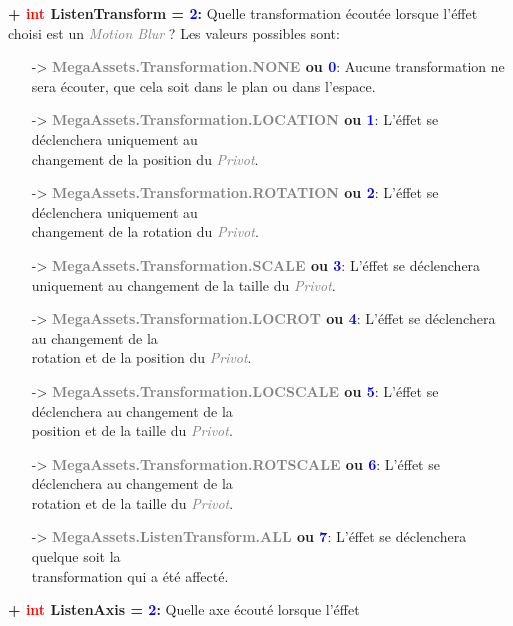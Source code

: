 \documentclass[a4paper, 11pt]{article}
\begin{document}
	\textbf{+ \textcolor{red}{int} ListenTransform = \textcolor{blue}{2}:} Quelle transformation écoutée 
	lorsque l'éffet choisi est un \textit{\textcolor{gray}{Motion Blur}} ? Les valeurs possibles sont:
	\begin{itemize}
		\item [-> \textbf{\textcolor{gray}{MegaAssets.Transformation.NONE} ou \textcolor{blue}{0}}:] Aucune 
		transformation ne sera écouter, que cela soit dans le plan ou dans l'espace.
		\item [-> \textbf{\textcolor{gray}{MegaAssets.Transformation.LOCATION} ou \textcolor{blue}{1}}:] 
		L'éffet se déclenchera uniquement au \\changement de la position du \textit{\textcolor{gray}
		{Privot}}.
		\item [-> \textbf{\textcolor{gray}{MegaAssets.Transformation.ROTATION} ou \textcolor{blue}{2}}:] 
		L'éffet se déclenchera uniquement au \\changement de la rotation du \textit{\textcolor{gray}
		{Privot}}.
		\newpage \item [-> \textbf{\textcolor{gray}{MegaAssets.Transformation.SCALE} ou \textcolor{blue}
		{3}}:] L'éffet se déclenchera uniquement au changement de la taille du \textit{\textcolor{gray}
		{Privot}}.
		\item [-> \textbf{\textcolor{gray}{MegaAssets.Transformation.LOCROT} ou \textcolor{blue}{4}}:] 
		L'éffet se déclenchera au changement de la \\rotation et de la position du \textit{\textcolor{gray}
		{Privot}}.
		\item [-> \textbf{\textcolor{gray}{MegaAssets.Transformation.LOCSCALE} ou \textcolor{blue}{5}}:] 
		L'éffet se déclenchera au changement de la \\position et de la taille du \textit{\textcolor{gray}
		{Privot}}.
		\item [-> \textbf{\textcolor{gray}{MegaAssets.Transformation.ROTSCALE} ou \textcolor{blue}{6}}:] 
		L'éffet se déclenchera au changement de la \\rotation et de la taille du \textit{\textcolor{gray}
		{Privot}}.
		\item [-> \textbf{\textcolor{gray}{MegaAssets.ListenTransform.ALL} ou \textcolor{blue}{7}}:] L'éffet
		se déclenchera quelque soit la \\transformation qui a été affecté.\\
	\end{itemize}
	\textbf{+ \textcolor{red}{int} ListenAxis = \textcolor{blue}{2}:} Quelle axe écouté lorsque l'éffet 
\end{document}
